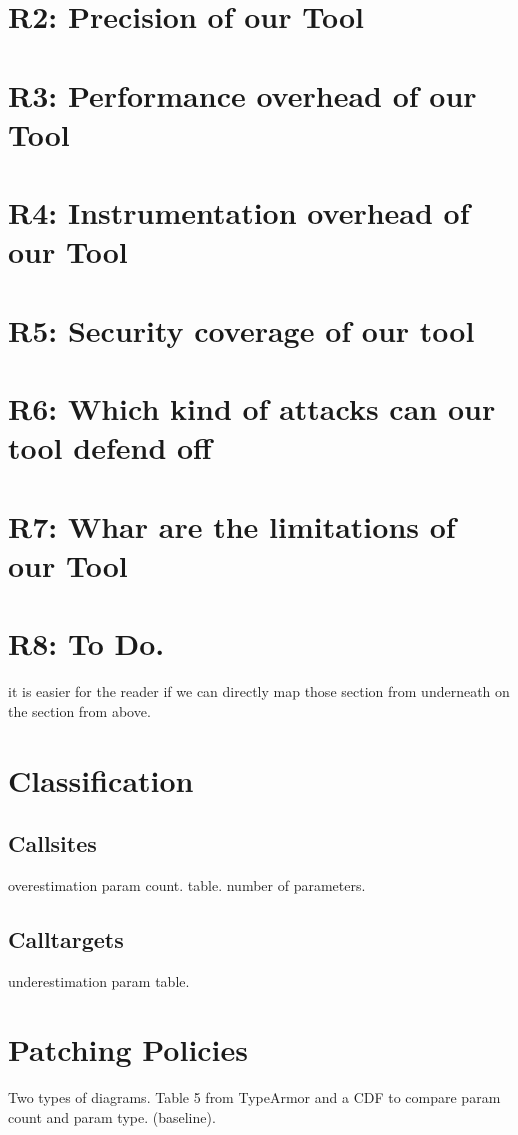 \section{R2: Precision of our Tool}

\section{R3: Performance overhead of our Tool}

\section{R4: Instrumentation overhead of our Tool}

\section{R5: Security coverage of our tool}

\section{R6: Which kind of attacks can our tool defend off}

\section{R7: Whar are the limitations of our Tool}

\section{R8: To Do.}


it is easier for the reader if we can directly map those section from underneath on the section from above.

\section{Classification}
\subsection{Callsites}
overestimation param count. table.
number of parameters.

\subsection{Calltargets}
underestimation param table.

\section{Patching Policies}
Two types of diagrams. Table 5 from TypeArmor and a CDF to compare param count and param type. (baseline).
